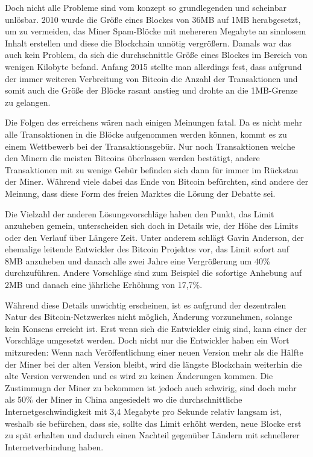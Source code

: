 Doch nicht alle Probleme sind vom konzept so grundlegenden und scheinbar unlösbar.
2010 wurde die Größe eines Blockes von 36MB auf 1MB herabgesetzt, um zu vermeiden, das Miner Spam-Blöcke mit mehereren Megabyte an sinnlosem Inhalt erstellen und diese die Blockchain unnötig vergrößern.
Damals war das auch kein Problem, da sich die durchschnittle Größe eines Blockes im Bereich von wenigen Kilobyte befand.
Anfang 2015 stellte man allerdings fest, dass aufgrund der immer weiteren Verbreitung von Bitcoin die Anzahl der Transaktionen und somit auch die Größe der Blöcke rasant anstieg und drohte an die 1MB-Grenze zu gelangen.

Die Folgen des erreichens wären nach einigen Meinungen fatal.
Da es nicht mehr alle Transaktionen in die Blöcke aufgenommen werden können, kommt es zu einem Wettbewerb bei der Transaktionsgebür.
Nur noch Transaktionen welche den Minern die meisten Bitcoins überlassen werden bestätigt, andere Transaktionen mit zu wenige Gebür befinden sich dann für immer im Rückstau der Miner.
Während viele dabei das Ende von Bitcoin befürchten, sind andere der Meinung, dass diese Form des freien Marktes die Lösung der Debatte sei.

Die Vielzahl der anderen Lösungsvorschläge haben den Punkt, das Limit anzuheben gemein, unterscheiden sich doch in Details wie, der Höhe des Limits oder den Verlauf über Längere Zeit.
Unter anderem schlägt Gavin Anderson, der ehemalige leitende Entwickler des Bitcoin Projektes vor, das Limit sofort auf 8MB anzuheben und danach alle zwei Jahre eine Vergrößerung um 40\% durchzuführen.
Andere Vorschläge sind zum Beispiel die sofortige Anhebung auf 2MB und danach eine jährliche Erhöhung von 17,7\%.

Während diese Details unwichtig erscheinen, ist es aufgrund der dezentralen Natur des Bitcoin-Netzwerkes nicht möglich, Änderung vorzunehmen, solange kein Konsens erreicht ist.
Erst wenn sich die Entwickler einig sind, kann einer der Vorschläge umgesetzt werden.
Doch nicht nur die Entwickler haben ein Wort mitzureden:
Wenn nach Veröffentlichung einer neuen Version mehr als die Hälfte der Miner bei der alten Version bleibt, wird die längste Blockchain weiterhin die alte Version verwenden und es wird zu keinen Änderungen kommen.
Die Zustimmugn der Miner zu bekommen ist jedoch auch schwirig, sind doch mehr als 50\% der Miner in China angesiedelt wo die durchschnittliche Internetgeschwindigkeit mit 3,4 Megabyte pro Sekunde  relativ langsam ist, weshalb sie befürchen, dass sie, sollte das Limit erhöht werden, neue Blocke erst zu spät erhalten und dadurch einen Nachteil gegenüber Ländern mit schnellerer Internetverbindung haben.

